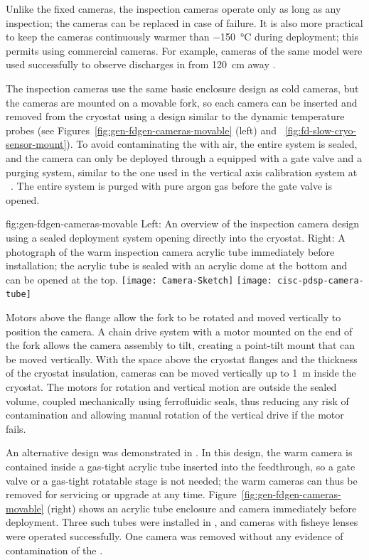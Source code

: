Unlike the fixed cameras, the inspection cameras operate only as
long as any inspection; the cameras can be replaced in case of failure.  It
is also more practical to keep the cameras continuously warmer than
 \SI{-150}{\celsius} during deployment; this permits using  %
commercial cameras. %
For example, cameras of the same model were used successfully to observe discharges
in \lar from \SI{120}{cm} away \cite{Auger:2015xlo}.


The inspection cameras use the same basic
enclosure design as cold cameras, but the cameras are mounted on a movable
fork, so each camera can be inserted and removed from the cryostat
using a design similar to the dynamic temperature probes (see
 Figures~\ref{fig:gen-fdgen-cameras-movable} (left) and
 ~\ref{fig:fd-slow-cryo-sensor-mount}).  To avoid contaminating the
\lar with air, the entire system is sealed, and the
camera can only be deployed through a \fdth equipped with a gate
valve and a purging system, similar to the one used in the vertical axis
calibration system at \kamland~\cite{Banks:2014hra}. The entire system
is  purged with pure argon gas before the gate valve is opened.

\begin{dunefigure}{fig:gen-fdgen-cameras-movable}
  {Left: An overview of the inspection camera design using a sealed deployment system opening directly into the cryostat. Right: A photograph of the  warm inspection camera acrylic tube immediately before installation; the acrylic tube is sealed with an acrylic dome at the bottom and can be opened at the top.}
  \texttt{[image: Camera-Sketch]}%
  \texttt{[image: cisc-pdsp-camera-tube]}%
\end{dunefigure}

Motors above the flange allow the fork to be rotated and moved vertically to position the camera. 
 A chain drive system with a motor
mounted on the end of the fork allows the camera assembly to tilt, 
creating a point-tilt mount that can be moved vertically.
With the space above the cryostat flanges and the
thickness of the cryostat insulation, cameras can be moved vertically up to
\SI{1}{m} inside the cryostat.
The motors for rotation and vertical motion are outside the sealed
volume, coupled mechanically using ferrofluidic seals, thus reducing any risk of
contamination and allowing manual rotation of the vertical
drive if the motor fails.  

An alternative design was demonstrated in . In this design, the warm camera is contained inside a gas-tight acrylic tube inserted into the feedthrough, so a gate valve or a gas-tight rotatable stage is not needed; the warm cameras can thus be removed for servicing or upgrade at any time. Figure~\ref{fig:gen-fdgen-cameras-movable} (right) shows an acrylic tube enclosure and camera immediately before deployment.
Three such tubes were installed in , and cameras with fisheye lenses were operated successfully.  One camera was removed without any evidence of contamination of the .


